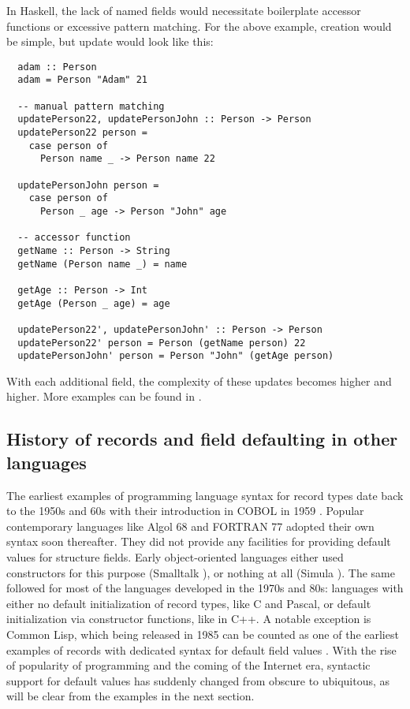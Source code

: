 \documentclass[en]{pracamgr}
\begin{document}
In Haskell, the lack of named fields would necessitate boilerplate accessor functions or excessive pattern matching.
For the above example, creation would be simple, but update would look like this:
\begin{lstlisting}
  adam :: Person
  adam = Person "Adam" 21

  -- manual pattern matching
  updatePerson22, updatePersonJohn :: Person -> Person
  updatePerson22 person = 
    case person of
      Person name _ -> Person name 22

  updatePersonJohn person = 
    case person of
      Person _ age -> Person "John" age

  -- accessor function
  getName :: Person -> String
  getName (Person name _) = name
  
  getAge :: Person -> Int
  getAge (Person _ age) = age

  updatePerson22', updatePersonJohn' :: Person -> Person
  updatePerson22' person = Person (getName person) 22
  updatePersonJohn' person = Person "John" (getAge person)

\end{lstlisting}
With each additional field, the complexity of these updates becomes higher and higher.
More examples can be found in \cite{WikibooksHaskellDatatypes}.
\subsection{History of records and field defaulting in other languages}
The earliest examples of programming language syntax for record types date back to the 1950s and 60s with their introduction in COBOL in 1959 \cite{sebesta1996concepts}.
Popular contemporary languages like Algol 68 \cite{van2012revised} and FORTRAN 77 \cite{fortran77} adopted their own syntax soon thereafter.
They did not provide any facilities for providing default values for structure fields.
Early object-oriented languages either used constructors for this purpose (Smalltalk \cite{smalltalk80}), or nothing at all (Simula \cite{Simula67}).
The same followed for most of the languages developed in the 1970s and 80s: languages with either no default initialization of record types, like C and Pascal,
or default initialization via constructor functions, like in C++.
A notable exception is Common Lisp, which being released in 1985 can be counted 
as one of the earliest examples of records with dedicated syntax for default field values \cite{CommonLisp}.
With the rise of popularity of programming and the coming of the Internet era, 
syntactic support for default values has suddenly changed from obscure to ubiquitous, as will be clear from the examples in the next section.
\end{document}
